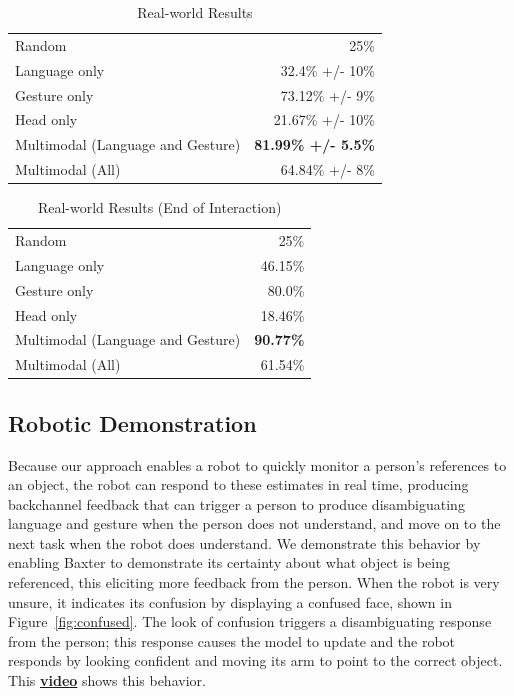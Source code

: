 \documentclass[letterpaper, 10 pt, conference]{ieeeconf}
\begin{document}
\begin{table}
\caption{Real-world Results\label{table:real_results}}
\centering
\begin{tabular}{lr}
\toprule
Random & 25\%\\
Language only &  32.4\% +/- 10\%\\
Gesture only  &  73.12\% +/- 9\%\\
Head only     &  21.67\% +/- 10\%\\
Multimodal (Language and Gesture) & {\bf 81.99\% +/- 5.5\%}\\
Multimodal (All) &  64.84\% +/- 8\%\\
\bottomrule
\end{tabular}
\end{table}
\begin{table}
\caption{Real-world Results (End of Interaction)\label{table:end_real}}
\centering
\begin{tabular}{lr}
\toprule
Random & 25\%\\
Language only &  46.15\%\\
Gesture only  &  80.0\%\\
Head only     & 18.46\%\\
Multimodal (Language and Gesture) & {\bf 90.77\%}\\
Multimodal (All) &  61.54\%\\
\bottomrule
\end{tabular}
\end{table}

\subsection{Robotic Demonstration}

Because our approach enables a robot to quickly monitor a person's
references to an object, the robot can respond to these estimates in
real time, producing backchannel feedback that can trigger a person to
produce disambiguating language and gesture when the person does not
understand, and move on to the next task when the robot does
understand.  We demonstrate this behavior by enabling Baxter to
demonstrate its certainty about what object is being referenced, this
eliciting more feedback from the person.  When the robot is very
unsure, it indicates its confusion by displaying a confused face,
shown in Figure~\ref{fig:confused}.  The look of confusion triggers a
disambiguating response from the person; this response causes the
model to update and the robot responds by looking confident and moving
its arm to point to the correct object.  This \href{https://vimeo.com/107725829}{\textbf{video}} shows this
behavior.
\end{document}
